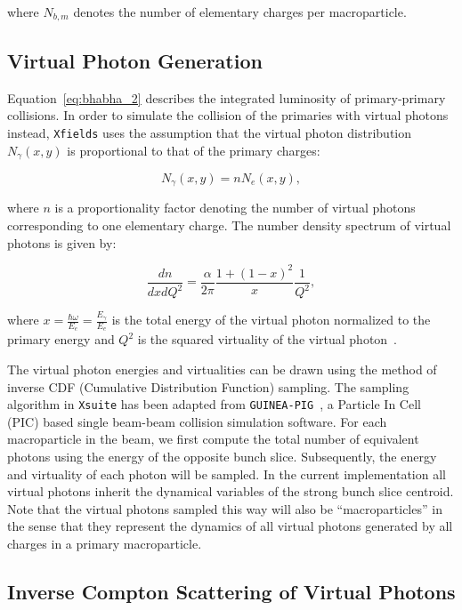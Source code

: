 where $N_{b,m}$ denotes the number of elementary charges per macroparticle.

\subsection{Virtual Photon Generation}

Equation~\eqref{eq:bhabha_2} describes the integrated luminosity of primary-primary collisions. In order to simulate the collision of the primaries with virtual photons instead, \texttt{Xfields} uses the assumption that the virtual photon distribution $N_{\gamma}(x,y)$ is proportional to that of the primary charges:

\begin{equation}
	N_{\gamma}(x,y) = nN_e(x,y),
	\label{eq:bhabha_3}
\end{equation}

where $n$ is a proportionality factor denoting the number of virtual photons corresponding to one elementary charge. The number density spectrum of virtual photons is given by:

\begin{equation}
	\frac{dn}{dxdQ^2} = \frac{\alpha}{2\pi}\frac{1 + (1 - x)^2}{x}\frac{1}{Q^2},
	\label{eq:bhabha_4}
\end{equation}

where $\displaystyle x=\frac{\hbar\omega}{E_e}=\frac{E_\gamma}{E_e}$ is the total energy of the virtual photon normalized to the primary energy and $Q^2$ is the squared virtuality of the virtual photon~\cite{Halzen:1984mc}. 

The virtual photon energies and virtualities can be drawn using the method of inverse CDF (Cumulative Distribution Function) sampling. The sampling algorithm in \texttt{Xsuite} has been adapted from \texttt{GUINEA-PIG}~\cite{guineapig}, a Particle In Cell (PIC) based single beam-beam collision simulation software. For each macroparticle in the beam, we first compute the total number of equivalent photons using the energy of the opposite bunch slice. Subsequently, the energy and virtuality of each photon will be sampled. In the current implementation all virtual photons inherit the dynamical variables of the strong bunch slice centroid. Note that the virtual photons sampled this way will also be ``macroparticles'' in the sense that they represent the dynamics of all virtual photons generated by all charges in a primary macroparticle.

\subsection{Inverse Compton Scattering of Virtual Photons}

